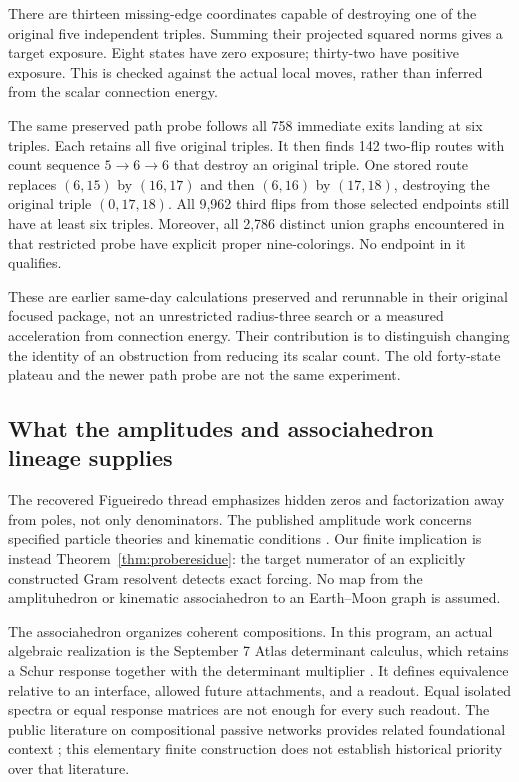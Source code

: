 \documentclass[11pt,letterpaper]{article}
\theoremstyle{definition}
\theoremstyle{remark}\newtheorem{remark}[theorem]{Remark}
\begin{document}
There are thirteen missing-edge coordinates capable of destroying one of the original five independent triples. Summing their projected squared norms gives a target exposure. Eight states have zero exposure; thirty-two have positive exposure. This is checked against the actual local moves, rather than inferred from the scalar connection energy.

The same preserved path probe follows all 758 immediate exits landing at six triples. Each retains all five original triples. It then finds 142 two-flip routes with count sequence $5\to6\to6$ that destroy an original triple. One stored route replaces $(6,15)$ by $(16,17)$ and then $(6,16)$ by $(17,18)$, destroying the original triple $(0,17,18)$. All 9,962 third flips from those selected endpoints still have at least six triples. Moreover, all 2,786 distinct union graphs encountered in that restricted probe have explicit proper nine-colorings. No endpoint in it qualifies.

These are earlier same-day calculations preserved and rerunnable in their original focused package, not an unrestricted radius-three search or a measured acceleration from connection energy. Their contribution is to distinguish changing the identity of an obstruction from reducing its scalar count. The old forty-state plateau and the newer path probe are not the same experiment.

\subsection{What the amplitudes and associahedron lineage supplies}
The recovered Figueiredo thread emphasizes hidden zeros and factorization away from poles, not only denominators. The published amplitude work concerns specified particle theories and kinematic conditions \cite{HiddenZeros,AllOrderSplits}. Our finite implication is instead Theorem~\ref{thm:proberesidue}: the target numerator of an explicitly constructed Gram resolvent detects exact forcing. No map from the amplituhedron or kinematic associahedron to an Earth--Moon graph is assumed.

The associahedron organizes coherent compositions. In this program, an actual algebraic realization is the September 7 Atlas determinant calculus, which retains a Schur response together with the determinant multiplier \cite{BeasleyCalculus}. It defines equivalence relative to an interface, allowed future attachments, and a readout. Equal isolated spectra or equal response matrices are not enough for every such readout. The public literature on compositional passive networks provides related foundational context \cite{BaezFong}; this elementary finite construction does not establish historical priority over that literature.
\end{document}
